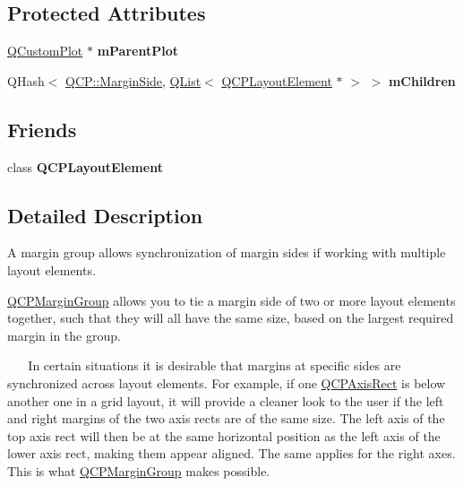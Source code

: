 \subsection*{Protected Attributes}
\begin{DoxyCompactItemize}
\item 
\hyperlink{class_q_custom_plot}{Q\+Custom\+Plot} $\ast$ {\bfseries m\+Parent\+Plot}\hypertarget{class_q_c_p_margin_group_a373c696f45bc34c2494ee71e6706938a}{}\label{class_q_c_p_margin_group_a373c696f45bc34c2494ee71e6706938a}

\item 
Q\+Hash$<$ \hyperlink{namespace_q_c_p_a7e487e3e2ccb62ab7771065bab7cae54}{Q\+C\+P\+::\+Margin\+Side}, \hyperlink{class_q_list}{Q\+List}$<$ \hyperlink{class_q_c_p_layout_element}{Q\+C\+P\+Layout\+Element} $\ast$ $>$ $>$ {\bfseries m\+Children}\hypertarget{class_q_c_p_margin_group_a38fb7136adfb2adeddd723ccdb983e18}{}\label{class_q_c_p_margin_group_a38fb7136adfb2adeddd723ccdb983e18}

\end{DoxyCompactItemize}
\subsection*{Friends}
\begin{DoxyCompactItemize}
\item 
class {\bfseries Q\+C\+P\+Layout\+Element}\hypertarget{class_q_c_p_margin_group_a9617e8ee457014d1c3a9f8379d3c667d}{}\label{class_q_c_p_margin_group_a9617e8ee457014d1c3a9f8379d3c667d}

\end{DoxyCompactItemize}


\subsection{Detailed Description}
A margin group allows synchronization of margin sides if working with multiple layout elements. 

\hyperlink{class_q_c_p_margin_group}{Q\+C\+P\+Margin\+Group} allows you to tie a margin side of two or more layout elements together, such that they will all have the same size, based on the largest required margin in the group.

~\newline
~\newline
 In certain situations it is desirable that margins at specific sides are synchronized across layout elements. For example, if one \hyperlink{class_q_c_p_axis_rect}{Q\+C\+P\+Axis\+Rect} is below another one in a grid layout, it will provide a cleaner look to the user if the left and right margins of the two axis rects are of the same size. The left axis of the top axis rect will then be at the same horizontal position as the left axis of the lower axis rect, making them appear aligned. The same applies for the right axes. This is what \hyperlink{class_q_c_p_margin_group}{Q\+C\+P\+Margin\+Group} makes possible.


